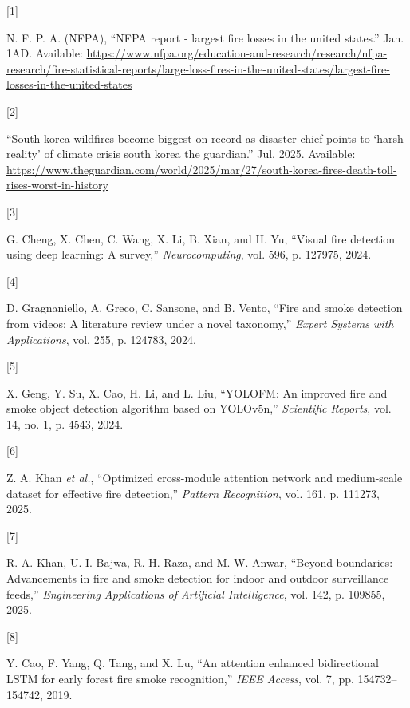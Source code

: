 \documentclass[
  10pt,
]{article}
\newlength{\cslhangindent}
\newlength{\csllabelwidth}
\newenvironment{CSLReferences}[2] %
 {\begin{list}{}{%
  \setlength{\itemindent}{0pt}
  \setlength{\leftmargin}{0pt}
  \setlength{\parsep}{0pt}
  \ifodd #1
   \setlength{\leftmargin}{\cslhangindent}
   \setlength{\itemindent}{-1\cslhangindent}
  \fi
  \setlength{\itemsep}{#2\baselineskip}}}
 {\end{list}}
\newcommand{\CSLLeftMargin}[1]{\parbox[t]{\csllabelwidth}{\strut#1\strut}}
\newcommand{\CSLRightInline}[1]{\parbox[t]{\linewidth - \csllabelwidth}{\strut#1\strut}}
\begin{document}
\label{refs}
\begin{CSLReferences}{0}{0}
\CSLLeftMargin{{[}1{]} }%
\CSLRightInline{N. F. P. A. (NFPA), {``NFPA report - largest fire losses
in the united states.''} Jan. 1AD. Available:
\url{https://www.nfpa.org/education-and-research/research/nfpa-research/fire-statistical-reports/large-loss-fires-in-the-united-states/largest-fire-losses-in-the-united-states}}

\CSLLeftMargin{{[}2{]} }%
\CSLRightInline{{``South korea wildfires become biggest on record as
disaster chief points to {`harsh reality'} of climate crisis \textbar{}
south korea \textbar{} the guardian.''} Jul. 2025. Available:
\url{https://www.theguardian.com/world/2025/mar/27/south-korea-fires-death-toll-rises-worst-in-history}}

\CSLLeftMargin{{[}3{]} }%
\CSLRightInline{G. Cheng, X. Chen, C. Wang, X. Li, B. Xian, and H. Yu,
{``Visual fire detection using deep learning: A survey,''}
\emph{Neurocomputing}, vol. 596, p. 127975, 2024.}

\CSLLeftMargin{{[}4{]} }%
\CSLRightInline{D. Gragnaniello, A. Greco, C. Sansone, and B. Vento,
{``Fire and smoke detection from videos: A literature review under a
novel taxonomy,''} \emph{Expert Systems with Applications}, vol. 255, p.
124783, 2024.}

\CSLLeftMargin{{[}5{]} }%
\CSLRightInline{X. Geng, Y. Su, X. Cao, H. Li, and L. Liu, {``YOLOFM: An
improved fire and smoke object detection algorithm based on YOLOv5n,''}
\emph{Scientific Reports}, vol. 14, no. 1, p. 4543, 2024.}

\CSLLeftMargin{{[}6{]} }%
\CSLRightInline{Z. A. Khan \emph{et al.}, {``Optimized cross-module
attention network and medium-scale dataset for effective fire
detection,''} \emph{Pattern Recognition}, vol. 161, p. 111273, 2025.}

\CSLLeftMargin{{[}7{]} }%
\CSLRightInline{R. A. Khan, U. I. Bajwa, R. H. Raza, and M. W. Anwar,
{``Beyond boundaries: Advancements in fire and smoke detection for
indoor and outdoor surveillance feeds,''} \emph{Engineering Applications
of Artificial Intelligence}, vol. 142, p. 109855, 2025.}

\CSLLeftMargin{{[}8{]} }%
\CSLRightInline{Y. Cao, F. Yang, Q. Tang, and X. Lu, {``An attention
enhanced bidirectional LSTM for early forest fire smoke recognition,''}
\emph{IEEE Access}, vol. 7, pp. 154732--154742, 2019.}


\end{CSLReferences}
\end{document}
